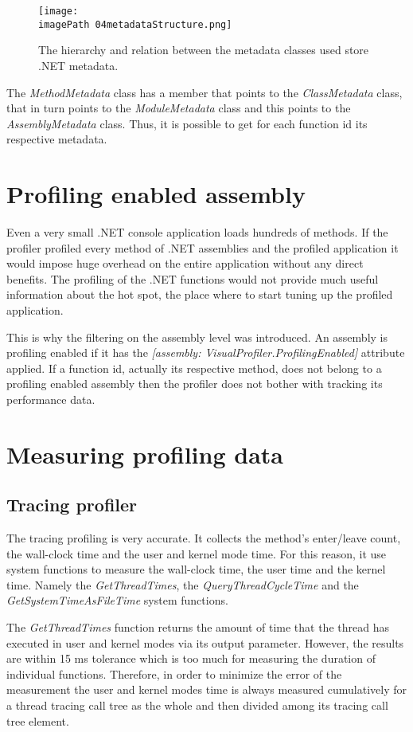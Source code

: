\begin{figure}
	\centering
		\texttt{[image: \\imagePath 04metadataStructure.png]}
		\caption{The hierarchy and relation between the metadata classes used store .NET metadata.}
	\label{fig:04metadataStructure}
\end{figure}

The \textit{MethodMetadata} class has a member that points to the \textit{ClassMetadata} class, that in turn points to the \textit{ModuleMetadata} class and this points to the \textit{AssemblyMetadata} class. Thus, it is possible to get for each function id its respective metadata.

\section{Profiling enabled assembly}
\label{subsubsec:04ProfEnabAssem}
Even a very small .NET console application loads hundreds of methods. If the profiler profiled every method of .NET assemblies and the profiled application it would impose huge overhead on the entire application without any direct benefits. The profiling of the .NET functions would not provide much useful information about the hot spot, the place where to start tuning up the profiled application. 

This is why the filtering on the assembly level was introduced. An assembly is profiling enabled if it has the \textit{[assembly: VisualProfiler.ProfilingEnabled]} attribute applied. If a function id, actually its respective method, does not belong to a profiling enabled assembly then the profiler does not bother with tracking its performance data.

\section{Measuring profiling data}
\subsection{Tracing profiler}
The tracing profiling is very accurate. It collects the method's enter/leave count, the wall-clock time and the user and kernel mode time. For this reason, it use system functions to measure the wall-clock time, the user time and the kernel time. Namely the \textit{GetThreadTimes}, the \textit{QueryThreadCycleTime} and the \textit{GetSystemTimeAsFileTime} system functions.

The \textit{GetThreadTimes} function returns the amount of time that the thread has executed in user and kernel modes via its output parameter. However, the results are within 15 ms tolerance which is too much for measuring the duration of individual functions. Therefore, in order to minimize the error of the measurement the user and kernel modes time is always measured cumulatively for a thread tracing call tree as the whole and then divided among its tracing call tree element. 


